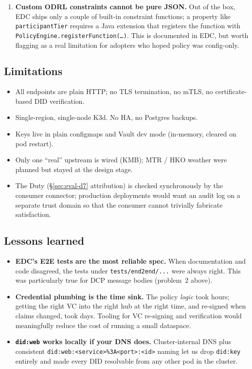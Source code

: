 \documentclass[11pt,a4paper]{article}
\DeclareRobustCommand{\code}[1]{\texttt{\small #1}}
\begin{document}
\begin{enumerate}
  \item \textbf{Custom ODRL constraints cannot be pure JSON.}
    Out of the box, EDC ships only a couple of built-in constraint
    functions; a property like \code{participantTier} requires a Java
    extension that registers the function with
    \code{PolicyEngine.registerFunction(\dots)}. This is documented in
    EDC, but worth flagging as a real limitation for adopters who
    hoped policy was config-only.
\end{enumerate}

\subsection{Limitations}

\begin{itemize}
  \item All endpoints are plain HTTP; no TLS termination, no mTLS, no
    certificate-based DID verification.
  \item Single-region, single-node K3d. No HA, no Postgres backups.
  \item Keys live in plain configmaps and Vault dev mode (in-memory,
    cleared on pod restart).
  \item Only one ``real'' upstream is wired (KMB); MTR / HKO weather
    were planned but stayed at the design stage.
  \item The Duty (§\ref{sec:eval-d7} attribution) is checked
    synchronously by the consumer connector; production deployments
    would want an audit log on a separate trust domain so that the
    consumer cannot trivially fabricate satisfaction.
\end{itemize}

\subsection{Lessons learned}

\begin{itemize}
  \item \textbf{EDC's E2E tests are the most reliable spec.} When
    documentation and code disagreed, the tests under
    \code{tests/end2end/...} were always right. This was particularly
    true for DCP message bodies (problem~2 above).
  \item \textbf{Credential plumbing is the time sink.} The policy
    \emph{logic} took hours; getting the right VC into the right hub
    at the right time, and re-signed when claims changed, took days.
    Tooling for VC re-signing and verification would meaningfully
    reduce the cost of running a small dataspace.
  \item \textbf{\code{did:web} works locally if your DNS does.}
    Cluster-internal DNS plus consistent
    \code{did:web:<service>\%3A<port>:<id>} naming let us drop
    \code{did:key} entirely and made every DID resolvable from any
    other pod in the cluster.
\end{itemize}
\end{document}
